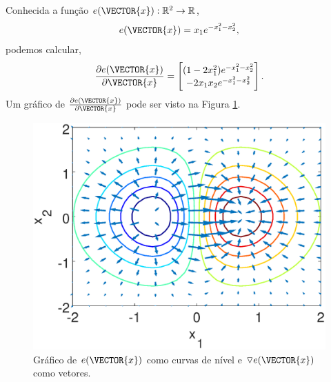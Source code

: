 \noindent
\begin{minipage}{0.5\textwidth}
\begin{example}
Conhecida a função $e(\VECTOR{x}): \mathbb{R}^2 \rightarrow \mathbb{R}$, 
\begin{equation}
e(\VECTOR{x})=x_1 e^{-x_1^2 - x_2^2},
\end{equation}
podemos calcular,
\begin{equation}
\frac{\partial e(\VECTOR{x}) }{\partial \VECTOR{x}}=
\begin{bmatrix}
(1-2 x_1^2) e^{-x_1^2 - x_2^2}\\
-2 x_1 x_2 e^{-x_1^2 - x_2^2}
\end{bmatrix}.
\end{equation}
Um gráfico de $\frac{\partial e(\VECTOR{x}) }{\partial \VECTOR{x}}$ pode ser visto na Figura \ref{fig:ex:gradient}.
\end{example}
\end{minipage}
\begin{minipage}{0.45\textwidth}
    \begin{figure}[H]
	\centering
        \includegraphics[width=\textwidth]{chapters/derivada/mfiles/gradiente/gradient.eps}
        \caption{Gráfico de $e(\VECTOR{x})$ como curvas de nível e $\triangledown e(\VECTOR{x})$ como vetores.}
        \label{fig:ex:gradient}
    \end{figure}
\end{minipage}

